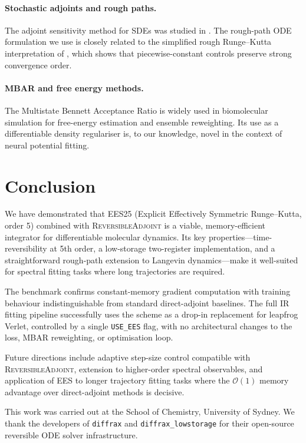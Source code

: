 \documentclass{article}
\newcommand{\EES}{\textsc{EES25}}
\newcommand{\RevAdj}{\textsc{ReversibleAdjoint}}
\newcommand{\diffrax}{\texttt{diffrax}}
\begin{document}
\paragraph{Stochastic adjoints and rough paths.}
The adjoint sensitivity method for SDEs was studied in \cite{li2020scalable}.
The rough-path ODE formulation we use is closely related to the simplified
rough Runge--Kutta interpretation of \cite{foster2023}, which shows that
piecewise-constant controls preserve strong convergence order.

\paragraph{MBAR and free energy methods.}
The Multistate Bennett Acceptance Ratio \cite{mbar2008} is widely used in
biomolecular simulation for free-energy estimation and ensemble reweighting.
Its use as a differentiable density regulariser is, to our knowledge, novel
in the context of neural potential fitting.

\section{Conclusion}
\label{sec:conclusion}

We have demonstrated that \EES{} (Explicit Effectively Symmetric Runge--Kutta,
order 5) combined with \RevAdj{} is a viable, memory-efficient integrator
for differentiable molecular dynamics.  Its key properties---time-reversibility
at 5th order, a low-storage two-register implementation, and a straightforward
rough-path extension to Langevin dynamics---make it well-suited for spectral
fitting tasks where long trajectories are required.

The benchmark confirms constant-memory gradient computation with training
behaviour indistinguishable from standard direct-adjoint baselines.  The
full IR fitting pipeline successfully uses the scheme as a drop-in replacement
for leapfrog Verlet, controlled by a single \texttt{USE\_EES} flag, with no
architectural changes to the loss, MBAR reweighting, or optimisation loop.

Future directions include adaptive step-size control compatible with
\RevAdj{}, extension to higher-order spectral observables, and application
of EES to longer trajectory fitting tasks where the $\mathcal{O}(1)$ memory
advantage over direct-adjoint methods is decisive.

\begin{ack}
This work was carried out at the School of Chemistry, University of Sydney.
We thank the developers of \diffrax{} and \texttt{diffrax\_lowstorage} for
their open-source reversible ODE solver infrastructure.
\end{ack}
\end{document}
